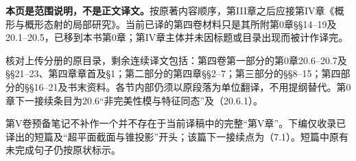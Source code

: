 \noindent\textbf{本页是范围说明，不是正文译文。}按原著内容顺序，第III章之后应接第IV章《概形与概形态射的局部研究》。当前已译的第四卷材料只是其所附第0章§§14--19及20.1--20.5，已移到本书第0章；第IV章主体并未因标题或目录出现而被计作译完。

核对上传分册的原目录，剩余连续译文包括：第四卷第一部分的第0章20.6--20.7及§§21--23、第四章章首及§1；第二部分的第四章§§2--7；第三部分的§§8--15；第四部分的§§16--21及书末资料。各节内部仍须以原段落为单位翻译，不用提纲替代。第0章下一接续条目为20.6“非完美性模与特征同态”及（20.6.1）。

第V卷预备笔记不补作一个并不存在于当前译稿中的完整“第V章”。下编仅收录已译出的短篇及“超平面截面与锥投影”开头；该篇下一接续点为（7.1）。短篇中原有未完成句子仍按原状标示。
